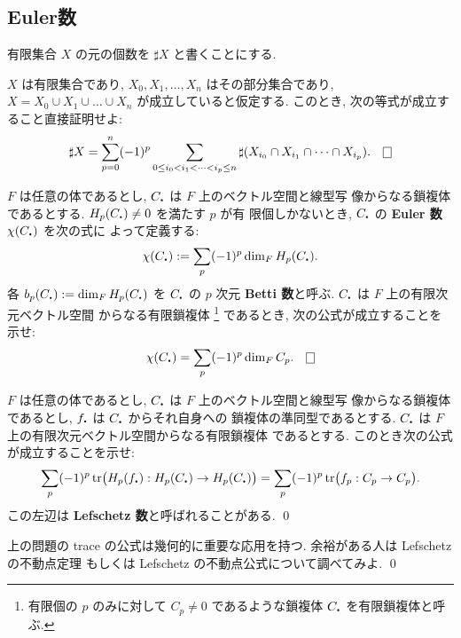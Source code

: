 \documentclass[12pt,twoside]{jarticle}
\begin{document}

\subsection{Euler数}

有限集合 $X$ の元の個数を $\sharp X$ と書くことにする.

\begin{question}\label{q:euler1}
  $X$ は有限集合であり, 
  $X_0,X_1,\dots,X_n$ はその部分集合であり,
  $X=X_0\cup X_1\cup\dots\cup X_n$ が成立していると仮定する. %
  このとき, 次の等式が成立すること直接証明せよ:
  \[
    \sharp X
    =
    \sum_{p=0}^n
    (-1)^p
    \sum_{0\le i_0<i_1<\dots<i_p\le n}
    \sharp(X_{i_0}\cap X_{i_1}\cap\dots\cap X_{i_p}).
  \qed
  \]
\end{question}

\begin{question}[Euler数とBetti数の定義]\label{q:euler2}
  $F$ は任意の体であるとし, $C_\bcdot$ は $F$ 上のベクトル空間と線型写
  像からなる鎖複体であるとする. $H_p(C_\bcdot) \ne 0$ を満たす $p$ が有
  限個しかないとき, $C_\bcdot$ の {\bf Euler 数} $\chi(C_\bcdot)$ を次の式に
  よって定義する:
  \[
    \chi(C_\bcdot) := \sum_p (-1)^p \dim_F H_p(C_\bcdot).
  \] %
  各 $b_p(C_\bcdot):=\dim_F H_p(C_\bcdot)$ を $C_\bcdot$ の $p$ 次元 
  {\bf Betti 数}と呼ぶ. $C_\bcdot$ は $F$ 上の有限次元ベクトル空間
  からなる有限鎖複体%
  \footnote{有限個の $p$ のみに対して $C_p\ne 0$ であるような鎖複体 
    $C_\bcdot$ を有限鎖複体と呼ぶ.}%
  であるとき, 次の公式が成立することを示せ: 
  \[
    \chi(C_\bcdot) = \sum_p (-1)^p \dim_F C_p.
    \qed
  \]
\end{question}

\begin{question}
  $F$ は任意の体であるとし, $C_\bcdot$ は $F$ 上のベクトル空間と線型写
  像からなる鎖複体であるとし, $f_\bcdot$ は $C_\bcdot$ からそれ自身への
  鎖複体の準同型であるとする.
  $C_\bcdot$ は $F$ 上の有限次元ベクトル空間からなる有限鎖複体
  であるとする. このとき次の公式が成立することを示せ: 
  \[
    \sum_p (-1)^p 
    \trace \bigl( H_p(f_\bcdot) : H_p(C_\bcdot) \to H_p(C_\bcdot)\bigr)
    = 
    \sum_p (-1)^p 
    \trace \bigl( f_p : C_p \to C_p \bigr).
  \]
 この左辺は {\bf Lefschetz 数}と呼ばれることがある.
 \qed
\end{question}

\begin{guide}
 上の問題の trace の公式は幾何的に重要な応用を持つ.
 余裕がある人は Lefschetz の不動点定理
 もしくは Lefschetz の不動点公式について調べてみよ.
 \qed
\end{guide}
\end{document}
